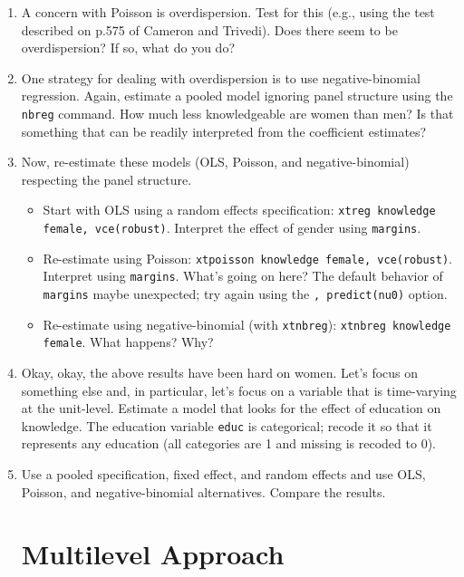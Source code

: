 \documentclass[a4paper,12pt]{article}
\begin{document}
\begin{enumerate}
\item A concern with Poisson is overdispersion. Test for this (e.g., using the test described on p.575 of Cameron and Trivedi). Does there seem to be overdispersion? If so, what do you do?

\item One strategy for dealing with overdispersion is to use negative-binomial regression. Again, estimate a pooled model ignoring panel structure using the \texttt{nbreg} command. How much less knowledgeable are women than men? Is that something that can be readily interpreted from the coefficient estimates?

\item Now, re-estimate these models (OLS, Poisson, and negative-binomial) respecting the panel structure. 

    \begin{itemize}
    \item Start with OLS using a random effects specification: \texttt{xtreg knowledge female, vce(robust)}. Interpret the effect of gender using \texttt{margins}.
    
    \item Re-estimate using Poisson: \texttt{xtpoisson knowledge female, vce(robust)}. Interpret using \texttt{margins}. What's going on here? The default behavior of \texttt{margins} maybe unexpected; try again using the \texttt{, predict(nu0)} option.
    
    \item Re-estimate using negative-binomial (with \texttt{xtnbreg}): \texttt{xtnbreg knowledge female}. What happens? Why?
    \end{itemize}

\item Okay, okay, the above results have been hard on women. Let's focus on something else and, in particular, let's focus on a variable that is time-varying at the unit-level. Estimate a model that looks for the effect of education on knowledge. The education variable \texttt{educ} is categorical; recode it so that it represents any education (all categories are 1 and missing is recoded to 0).

\item Use a pooled specification, fixed effect, and random effects and use OLS, Poisson, and negative-binomial alternatives. Compare the results.

\section{Multilevel Approach}


\end{enumerate}
\end{document}

